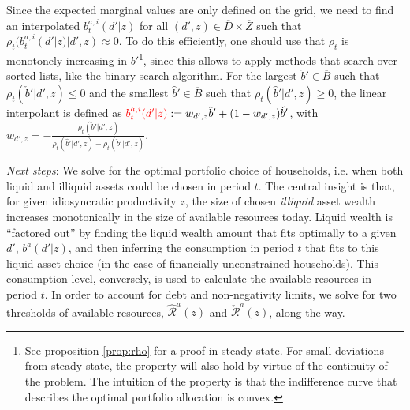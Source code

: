 \documentclass[11pt]{article} %
\newcounter{break}
\begin{document}
\begin{enumerate}[a.)]
Since the expected marginal values are only defined on the grid, we need to find an interpolated $b_t^{a,i}(d'|z)$ for all $(d',z) \in \overline{D}\times\overline{Z}$ such that $\rho_t(b_t^{a,i}(d'|z)|d',z)\approx 0$. To do this efficiently, one should use that $\rho_t$ is monotonely increasing in $b'$\footnote{See proposition \ref{prop:rho} for a proof in steady state. For small deviations from steady state, the property will also hold by virtue of the continuity of the problem. The intuition of the property is that the indifference curve that describes the optimal portfolio allocation is convex.}, since this allows to apply methods that search over sorted lists, like the binary search algorithm. For the largest $\check{b}'\in\overline{B}$ such that $\rho_t(\check{b}'|d',z) \leq 0$ and the smallest $\hat{b}'\in\overline{B}$ such that $\rho_t(\hat{b}'|d',z) \geq 0$, the linear interpolant is defined as $\textcolor{red}{b_t^{a,i}(d'|z)} := w_{d',z} \hat{b}' + (1-w_{d',z})\check{b}'$, with $w_{d',z} = -\frac{\rho_t(\check{b}'|d',z)}{\rho_t(\hat{b}'|d',z)-\rho_t(\check{b}'|d',z)}$.
\setcounter{break}{\value{enumi}}
\end{enumerate}

\textit{Next steps}: We solve for the optimal portfolio choice of households, i.e. when both liquid and illiquid assets could be chosen in period $t$. The central insight is that, for given idiosyncratic productivity $z$, the size of chosen \textit{illiquid} asset wealth increases monotonically in the size of available resources today. Liquid wealth is ``factored out'' by finding the liquid wealth amount that fits optimally to a given $d'$, $b^a(d'|z)$, and then inferring the consumption in period $t$ that fits to this liquid asset choice (in the case of financially unconstrained households). This consumption level, conversely, is used to calculate the available resources in period $t$. In order to account for debt and non-negativity limits, we solve for two thresholds of available resources, $\hat{\mathcal{R}}^a(z)$ and $\check{\mathcal{R}}^a(z)$, along the way.
\end{document}
